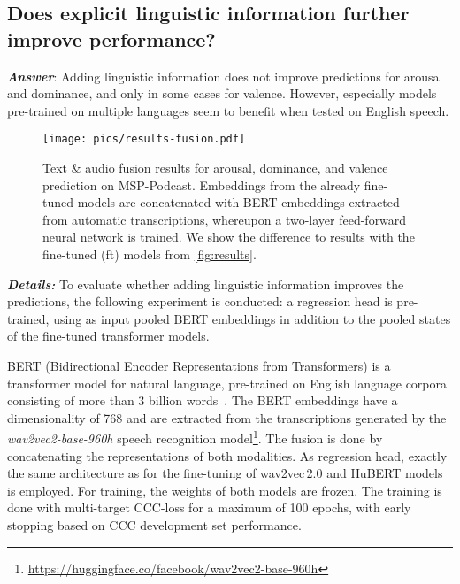 \documentclass{article}
\newcommand\msppodcast{\mbox{MSP-Podcast}}
\newcommand{\wtov}{wav2vec\,2.0}
\newcommand{\hubert}{HuBERT}
\begin{document}
\subsection{Does explicit linguistic information further improve performance?}
\label{subsec:fusion}

\emph{\textbf{Answer}}:
Adding linguistic information does not improve predictions for arousal and dominance,
and only in some cases for valence.
However, especially models pre-trained on multiple languages seem to benefit when tested on English speech.

\begin{figure}[t]
    \centering
    \texttt{[image: pics/results-fusion.pdf]}
    \caption{
        Text \& audio fusion results for arousal, dominance, and valence prediction on {\msppodcast}.
        Embeddings from the already fine-tuned models are concatenated with BERT embeddings extracted from automatic transcriptions, whereupon a two-layer feed-forward neural network is trained. 
        We show the difference to results with the fine-tuned (ft) models from \cref{fig:results}.
    }
    \label{fig:fusion}
\end{figure}

\noindent
\emph{\textbf{Details:}}
To evaluate whether adding linguistic information improves the predictions, the following experiment is conducted: a regression head is pre-trained, using as input pooled BERT embeddings in addition to the pooled states of the fine-tuned transformer models.

BERT (Bidirectional Encoder Representations from Transformers) is a transformer model for natural language, pre-trained on English language corpora consisting of more than $3$ billion words~\cite{devlin2019bert}. 
The BERT embeddings have a dimensionality of 768 and are extracted from the transcriptions generated by the \emph{wav2vec2-base-960h} speech recognition model\footnote{\url{https://huggingface.co/facebook/wav2vec2-base-960h}}.
The fusion is done by concatenating the representations of both modalities.
As regression head, exactly the same architecture as for the fine-tuning of {\wtov} and {\hubert} models is employed.
For training, the weights of both models are frozen. 
The training is done with multi-target \ac{CCC}-loss for a maximum of 100 epochs, with early stopping based on \ac{CCC} development set performance. 
\end{document}

